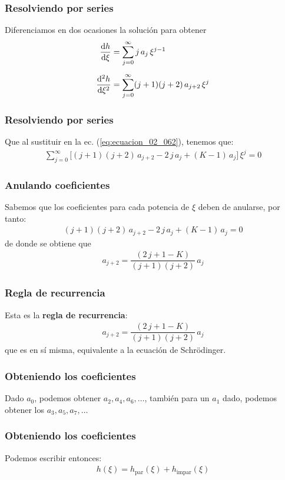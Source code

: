\documentclass[12pt]{beamer}
\begin{document}
\begin{frame}
\frametitle{Resolviendo por series}
Diferenciamos en dos ocasiones la solución para obtener
\begin{align*}
\dv{h}{\xi} &= \sum_{j=0}^{\infty} j \, a_{j} \, \xi^{j-1} \\[0.5em]
\dv[2]{h}{\xi} &= \sum_{j=0}^{\infty} (j + 1)(j + 2) \, a_{j+2} \, \xi^{j}
\end{align*}
\end{frame}
\begin{frame}
\frametitle{Resolviendo por series}
Que al sustituir en la ec. (\ref{eq:ecuacion_02_062}), tenemos que:
\pause
\begin{align}
\sum_{j=0}^{\infty} \bigg[ (j + 1)(j + 2) \, a_{j+2} - 2 \, j \, a_{j} +  (K - 1) \, a_{j} \bigg] \, \xi^{j} = 0
\label{eq:ecuacion_02_64}
\end{align}
\end{frame}
\begin{frame}
\frametitle{Anulando coeficientes}
Sabemos que los coeficientes para cada potencia de $\xi$ deben de anularse, por tanto:
\pause
\begin{align*}
(j + 1)(j + 2) \, a_{j+2} - 2 \, j \, a_{j} +  (K - 1) \, a_{j} = 0
\end{align*}
\pause
de donde se obtiene que
\begin{align}
a_{j+2} = \dfrac{(2 \, j + 1 - K)}{(j + 1)(j + 2)} \, a_{j}
\label{eq:ecuacion_02_065}
\end{align}
\end{frame}
\begin{frame}
\frametitle{Regla de recurrencia}
Esta es la \textbf{regla de recurrencia}:
\begin{align*}
a_{j+2} = \dfrac{(2 \, j + 1 - K)}{(j + 1)(j + 2)} \, a_{j}
\end{align*}
\pause
que es en sí misma, equivalente a la ecuación de Schrödinger.
\end{frame}
\begin{frame}
\frametitle{Obteniendo los coeficientes}
Dado $a_{0}$, podemos obtener $a_{2}, a_{4}, a_{6}, \ldots$, también para un $a_{1}$ dado, podemos obtener los $a_{3}, a_{5}, a_{7}, \ldots$
\end{frame}
\begin{frame}
\frametitle{Obteniendo los coeficientes}
Podemos escribir entonces:
\begin{align}
h (\xi) = h_{\text{par}} (\xi) + h_{\text{impar}} (\xi)
\label{eq:ecuacion_02_066}
\end{align}
\end{frame}
\end{document}

